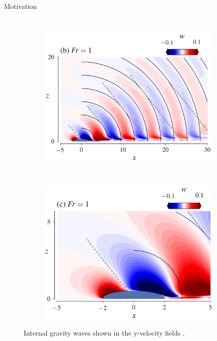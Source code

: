 \documentclass[aspectratio=169,xcolor=dvipsnames]{beamer}
\begin{document}
\begin{frame}{Motivation}
\begin{columns}[c]
        \begin{figure}
            \centering
            \begin{subfigure}[b]{0.5\textwidth}
                \includegraphics[width=\textwidth]{figures/bigviewIGW.png}
            \end{subfigure}\\
            \begin{subfigure}[b]{0.5\textwidth}
                \includegraphics[width=\textwidth]{figures/smallviewIGW.png}
            \end{subfigure}
            \label{fig:ortiz}
            \caption{Internal gravity waves shown in the y-velocity fields \cite{ortiz2019stratified}.}
        \end{figure} 
        
    \end{columns}
\end{frame}
\end{document}
